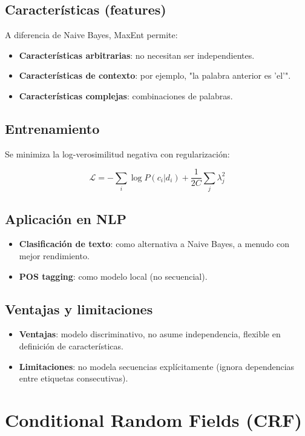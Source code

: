 \documentclass[12pt,a4paper,openany,oneside]{book}
\begin{document}
\subsection{Características (features)}
A diferencia de Naive Bayes, MaxEnt permite:
\begin{itemize}
    \item \textbf{Características arbitrarias}: no necesitan ser independientes.
    \item \textbf{Características de contexto}: por ejemplo, "la palabra anterior es 'el'".
    \item \textbf{Características complejas}: combinaciones de palabras.
\end{itemize}

\subsection{Entrenamiento}
Se minimiza la log-verosimilitud negativa con regularización:

\[
\mathcal{L} = -\sum_i \log P(c_i|d_i) + \frac{1}{2C} \sum_j \lambda_j^2
\]

\subsection{Aplicación en NLP}
\begin{itemize}
    \item \textbf{Clasificación de texto}: como alternativa a Naive Bayes, a menudo con mejor rendimiento.
    \item \textbf{POS tagging}: como modelo local (no secuencial).
\end{itemize}

\subsection{Ventajas y limitaciones}
\begin{itemize}
    \item \textbf{Ventajas}: modelo discriminativo, no asume independencia, flexible en definición de características.
    \item \textbf{Limitaciones}: no modela secuencias explícitamente (ignora dependencias entre etiquetas consecutivas).
\end{itemize}

\section{Conditional Random Fields (CRF)}
\end{document}
